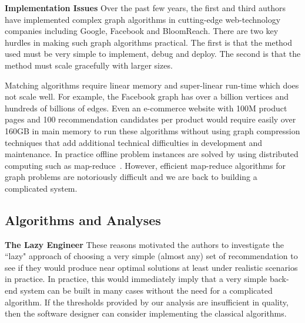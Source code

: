 \noindent
{\bf Implementation Issues} Over the past few years, the first and
third authors have implemented complex graph algorithms in
cutting-edge web-technology companies including Google, Facebook and
BloomReach. There are two key hurdles in making such graph algorithms
practical. The first is that the method used must be very simple to
implement, debug and deploy. The second is that the method must scale
gracefully with larger sizes. \vs

Matching algorithms require linear memory and super-linear run-time
which does not scale well. For example, the Facebook graph has over a
billion vertices\cite{FacebookNodes} and hundreds of billions of edges. Even an
e-commerce website with 100M product pages and 100 recommendation candidates per
product would require easily over 160GB in main memory to run these
algorithms without using graph compression techniques that add additional technical difficulties
in development and maintenance. In practice offline problem instances are solved by using
distributed computing such as map-reduce~\cite{DeanGhemawat2004}. 
However, efficient map-reduce algorithms for graph problems
are notoriously difficult and we are back to building a complicated
system. \vs


\subsection{Algorithms and Analyses}

{\bf The Lazy Engineer} These reasons motivated the authors to
investigate the ``lazy" approach of choosing a very simple (almost
any) set of recommendation to see if they would produce near optimal
solutions at least under realistic scenarios in practice.  In
practice, this would immediately imply that a very simple back-end
system can be built in many cases without the need for a complicated
algorithm. If the thresholds provided by our analysis are insufficient
in quality, then the software designer can consider implementing the classical
algorithms. \vs

